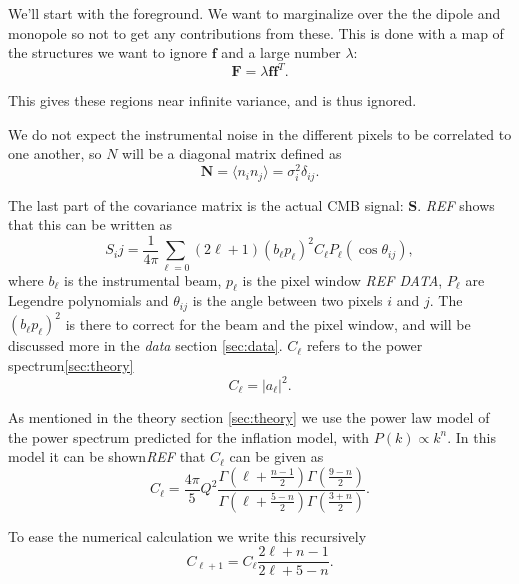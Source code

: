 \documentclass{emulateapj}
\begin{document}
We'll start with the foreground. We want to marginalize over the the dipole and monopole so not to get any contributions from these. This is done with a map of the structures we want to ignore $\mathbf{f}$ and a large number $\lambda$:
\begin{equation}
\mathbf{F} = \lambda \mathbf{f}\mathbf{f}^T.
\end{equation}

This gives these regions near infinite variance, and is thus ignored.

We do not expect the instrumental noise in the different pixels to be correlated to one another, so $N$ will be a diagonal matrix defined as
\begin{equation}
\mathbf{N} = \langle n_i n_j\rangle = \sigma_i^2\delta_{ij}.
\end{equation}

The last part of the covariance matrix is the actual CMB signal: $\mathbf{S}$. \emph{REF} shows that this can be written as 
\begin{equation}
S_ij = \frac{1}{4\pi}\sum_{\ell=0}(2\ell + 1)(b_\ell p_\ell)^2 C_\ell P_\ell(\cos\theta_{ij}),
\end{equation}
where $b_\ell$ is the instrumental beam, $p_\ell$ is the pixel window \emph{REF DATA}, $P_\ell$ are Legendre polynomials and $\theta_{ij}$ is the angle between two pixels $i$ and $j$. The $(b_\ell p_\ell)^2$ is there to correct for the beam and the pixel window, and will be discussed more in the \textit{data} section \ref{sec:data}. $C_\ell$ refers to the power spectrum\ref{sec:theory} 
\begin{equation}
C_\ell = |a_\ell|^2.
\end{equation}

As mentioned in the theory section \ref{sec:theory} we use the power law model of the power spectrum predicted for the inflation model, with $P(k) \propto k^n$. In this model it can be shown\emph{REF} that $C_\ell$ can be given as
\begin{equation}
C_\ell = \frac{4\pi}{5}Q^2\frac{\Gamma\left(\ell + \frac{n-1}{2}\right)\Gamma\left(\frac{9-n}{2}\right)}{\Gamma\left(\ell + \frac{5-n}{2}\right)\Gamma\left(\frac{3+n}{2}\right)}.
\end{equation}

To ease the numerical calculation we write this recursively
\begin{equation}
C_{\ell + 1} = C_\ell \frac{2\ell + n -1}{2\ell + 5 - n}.
\end{equation}
\end{document}
